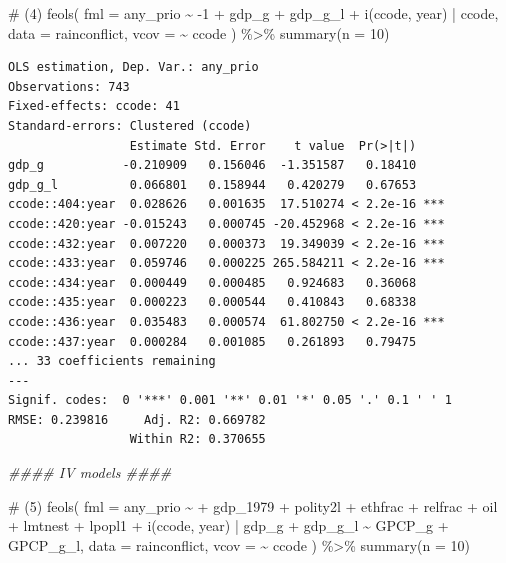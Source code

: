 \documentclass[
  a4paper,
  DIV=11,
  oneside]{scrreprt}
\newenvironment{Shaded}{\begin{snugshade}}{\end{snugshade}}
\newcommand{\AttributeTok}[1]{\textcolor[rgb]{0.40,0.45,0.13}{#1}}
\newcommand{\CommentTok}[1]{\textcolor[rgb]{0.37,0.37,0.37}{#1}}
\newcommand{\DecValTok}[1]{\textcolor[rgb]{0.68,0.00,0.00}{#1}}
\newcommand{\DocumentationTok}[1]{\textcolor[rgb]{0.37,0.37,0.37}{\textit{#1}}}
\newcommand{\FunctionTok}[1]{\textcolor[rgb]{0.28,0.35,0.67}{#1}}
\newcommand{\NormalTok}[1]{\textcolor[rgb]{0.00,0.23,0.31}{#1}}
\newcommand{\SpecialCharTok}[1]{\textcolor[rgb]{0.37,0.37,0.37}{#1}}
\begin{document}
\begin{Shaded}
\begin{Highlighting}[]
\CommentTok{\# (4)}
\FunctionTok{feols}\NormalTok{(}
  \AttributeTok{fml =}\NormalTok{ any\_prio }\SpecialCharTok{\textasciitilde{}} \SpecialCharTok{{-}}\DecValTok{1}
  \SpecialCharTok{+}\NormalTok{  gdp\_g }
  \SpecialCharTok{+}\NormalTok{  gdp\_g\_l}
  \SpecialCharTok{+} \FunctionTok{i}\NormalTok{(ccode, year)}
  \SpecialCharTok{|}\NormalTok{ ccode,}
  \AttributeTok{data =}\NormalTok{ rainconflict,}
  \AttributeTok{vcov =} \SpecialCharTok{\textasciitilde{}}\NormalTok{ ccode}
\NormalTok{) }\SpecialCharTok{\%\textgreater{}\%} 
  \FunctionTok{summary}\NormalTok{(}\AttributeTok{n =} \DecValTok{10}\NormalTok{)}
\end{Highlighting}
\end{Shaded}

\begin{verbatim}
OLS estimation, Dep. Var.: any_prio
Observations: 743
Fixed-effects: ccode: 41
Standard-errors: Clustered (ccode) 
                 Estimate Std. Error    t value  Pr(>|t|)    
gdp_g           -0.210909   0.156046  -1.351587   0.18410    
gdp_g_l          0.066801   0.158944   0.420279   0.67653    
ccode::404:year  0.028626   0.001635  17.510274 < 2.2e-16 ***
ccode::420:year -0.015243   0.000745 -20.452968 < 2.2e-16 ***
ccode::432:year  0.007220   0.000373  19.349039 < 2.2e-16 ***
ccode::433:year  0.059746   0.000225 265.584211 < 2.2e-16 ***
ccode::434:year  0.000449   0.000485   0.924683   0.36068    
ccode::435:year  0.000223   0.000544   0.410843   0.68338    
ccode::436:year  0.035483   0.000574  61.802750 < 2.2e-16 ***
ccode::437:year  0.000284   0.001085   0.261893   0.79475    
... 33 coefficients remaining
---
Signif. codes:  0 '***' 0.001 '**' 0.01 '*' 0.05 '.' 0.1 ' ' 1
RMSE: 0.239816     Adj. R2: 0.669782
                 Within R2: 0.370655
\end{verbatim}

\begin{Shaded}
\begin{Highlighting}[]
\DocumentationTok{\#\#\#\# IV models \#\#\#\#}

\CommentTok{\# (5)}
\FunctionTok{feols}\NormalTok{(}
  \AttributeTok{fml =}\NormalTok{ any\_prio }\SpecialCharTok{\textasciitilde{}}
  \SpecialCharTok{+}\NormalTok{ gdp\_1979}
  \SpecialCharTok{+}\NormalTok{ polity2l }
  \SpecialCharTok{+}\NormalTok{ ethfrac }
  \SpecialCharTok{+}\NormalTok{ relfrac }
  \SpecialCharTok{+}\NormalTok{ oil }
  \SpecialCharTok{+}\NormalTok{ lmtnest }
  \SpecialCharTok{+}\NormalTok{ lpopl1 }
  \SpecialCharTok{+} \FunctionTok{i}\NormalTok{(ccode, year)}
  \SpecialCharTok{|}\NormalTok{ gdp\_g }\SpecialCharTok{+}\NormalTok{ gdp\_g\_l }\SpecialCharTok{\textasciitilde{}}\NormalTok{ GPCP\_g }\SpecialCharTok{+}\NormalTok{ GPCP\_g\_l, }
  \AttributeTok{data =}\NormalTok{ rainconflict,}
  \AttributeTok{vcov =} \SpecialCharTok{\textasciitilde{}}\NormalTok{ ccode}
\NormalTok{) }\SpecialCharTok{\%\textgreater{}\%} 
  \FunctionTok{summary}\NormalTok{(}\AttributeTok{n =} \DecValTok{10}\NormalTok{)}
\end{Highlighting}
\end{Shaded}
\end{document}
